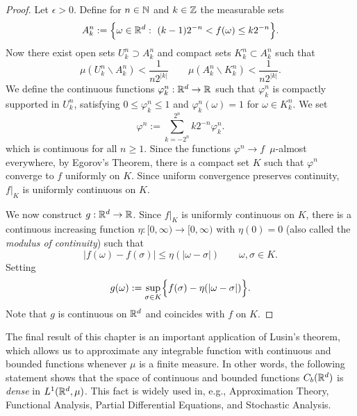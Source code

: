 \begin{proof}
	Let $\epsilon > 0$.
	Define for $n \in \mathbb N$ and $k \in \mathbb Z$ the measurable sets
	\[
	A^n_k := \Bigl\{ \omega \in \mathbb R^d : \  (k-1) 2^{-n} < f(\omega) \leq k 2^{-n} \Bigr\}.
	\]
	Now there exist open sets $U^n_k \supset A^n_k$ and compact sets $K^n_k \subset A^n_k$ such that
	\[
		\mu(U_k^n \backslash A_k^n ) < \frac{1}{n 2^{|k|}} \qquad \mu(A_k^n \backslash K_k^n ) < \frac{1}{n 2^{|k|}}.
	\]
	We define the continuous functions $\varphi_k^n: \mathbb R^d \to \mathbb R$ such that $\varphi_k^n$ is compactly supported in $U_k^n$, satisfying $0 \leq \varphi_k^n \leq 1$ and $\varphi_k^n(\omega) = 1$ for $\omega \in K_k^n$. We set
	\[
		\varphi^n := \sum_{k = -2^n}^{2^n} k 2^{-n} \varphi_k^n.
	\]
	which is continuous for all $n\ge 1$. Since the functions $\varphi^n\to f$\, $\mu$-almost everywhere, by Egorov's Theorem, there is a compact set $K$ such that $\varphi^n$ converge to $f$ uniformly on $K$. Since uniform convergence preserves continuity, $f|_K$ is uniformly continuous on $K$.
	
	We now construct $g: \mathbb R^d \to \mathbb R$. Since $f|_K$ is uniformly continuous on $K$, there is a continuous increasing function $\eta: [0,\infty) \to [0,\infty)$ with $\eta(0)=0$ (also called the \emph{modulus of continuity}) such that
	\[
		|f(\omega) - f(\sigma)| \leq \eta( |\omega-\sigma|)\qquad \omega,\sigma\in K.
	\]
	Setting
	\[
		g(\omega) := \sup_{\sigma \in K} \Bigl\{f(\sigma) - \eta(|\omega-\sigma|)\Bigr\}.
	\]
	Note that $g$ is continuous on $\mathbb R^d$ and coincides with $f$ on $K$.
\end{proof}

The final result of this chapter is an important application of Lusin's theorem, which allows us to approximate any integrable function with continuous and bounded functions whenever $\mu$ is a finite measure. In other words, the following statement shows that the space of continuous and bounded functions $C_b(\mathbb R^d)$ is \emph{dense} in $L^1(\mathbb R^d,\mu)$. This fact is widely used in, e.g., Approximation Theory, Functional Analysis, Partial Differential Equations, and Stochastic Analysis.

